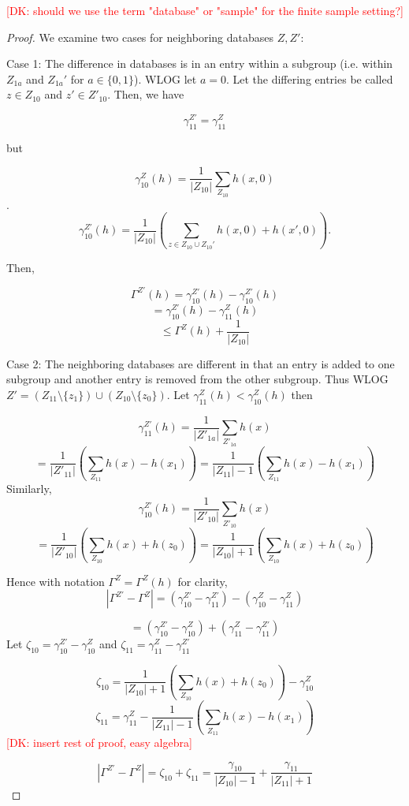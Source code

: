 \documentclass[format = sigconf]{acmart}
\newcommand{\dk}[1]{\textcolor{red}{[DK: #1]}}
\newcommand{\1}{\mathbbm{1}}
\newcommand{\zt}{\zeta}
\newcommand{\gz}[1]{\gamma_{#1}^Z(h)}
\newcommand{\z}[1]{Z_{#1}}
\theoremstyle{definition}
\begin{document}
\dk{should we use the term "database" or "sample" for the finite sample setting?}
\begin{proof}
We examine two cases for neighboring databases $Z, Z'$:

Case 1: The difference in databases is in an entry within a subgroup
(i.e. within $Z_{1a}$ and $Z_{1a}'$ for $a \in \{0, 1\}$). WLOG let $a
= 0$. Let the differing entries be called $z \in \z{10}$ and $z' \in
Z'_{10}$. Then, we have

$$\gamma^{Z'}_{11} = \gamma^Z_{11}$$

but

$$\gamma_{10}^Z(h) = \frac{1}{|\z{10}|} \sum_{\z{10}} h(x,0)$$.
$$\gamma_{10}^{Z'}(h) = \frac{1}{|\z{10}|} (\sum_{z \in \z{10} \cup \z{10}'} h(x, 0) + h(x', 0)).$$

Then,

$$ \Gamma^{Z'}(h) = \gamma_{10}^{Z'}(h) - \gamma_{10}^{Z'}(h) $$
$$ = \gamma_{10}^{Z'}(h) - \gz{11} $$
$$ \leq \Gamma^{Z}(h) + \frac{1}{|\z{10}|} $$


Case 2: The neighboring databases are different in that an entry is added to one subgroup and another entry is removed from the other subgroup. Thus WLOG $Z' =(Z_{11}\setminus
\{z_1\} )\cup( \z{10}\setminus \{z_0\})$. Let $\gamma_{11}^{Z}(h)
<\gamma_{10}^{Z}(h)$ then

$$\gamma_{11}^{Z'}(h) = \frac{1}{|Z'_{1a}|} \sum_{Z'_{1a}} h(x)$$
$$= \frac{1}{|Z'_{11}|} (\sum_{Z_{11}} h(x)-h(x_1)) = \frac{1}{|Z_{11}|-1} (\sum_{Z_{11}} h(x)-h(x_1))$$
Similarly,
$$\gamma_{10}^{Z'}(h) = \frac{1}{|Z'_{10}|} \sum_{Z'_{10}} h(x)$$
$$ = \frac{1}{|Z'_{10}|} (\sum_{\z{10}} h(x)+h(z_0))= \frac{1}{|\z{10}|+1} (\sum_{\z{10}} h(x)+h(z_0))$$

Hence with notation $ \Gamma^Z = \Gamma^Z(h)$ for clarity, $$|\Gamma^{Z'}- \Gamma^{Z}| = (\gamma_{10}^{Z'} - \gamma_{11}^{Z'}) - (\gamma_{10}^{Z} - \gamma_{11}^{Z})$$


$$=(\gamma_{10}^{Z'}- \gamma_{10}^{Z}) + (\gamma_{11}^{Z} -\gamma_{11}^{Z'})$$
Let $\zt_{10}= \gamma_{10}^{Z'}- \gamma_{10}^{Z}$ and  $\zt_{11} = \gamma_{11}^{Z} -\gamma_{11}^{Z'}$

$$\zt_{10} = \frac{1}{|\z{10}|+1} (\sum_{\z{10}} h(x)+h(z_0)) - \gamma_{10}^{Z}$$
$$\zt_{11} = \gamma_{11}^{Z}- \frac{1}{|Z_{11}|-1} (\sum_{Z_{11}} h(x)-h(x_1))$$
\dk {insert rest of proof, easy algebra}

$$|\Gamma^{Z'}- \Gamma^{Z}| = \zt_{10} + \zt_{11}= \frac{\gamma_{10}}{|\z{10}|-1} + \frac{\gamma_{11}}{|Z_{11}|+1} $$
\end{proof}
\end{document}
